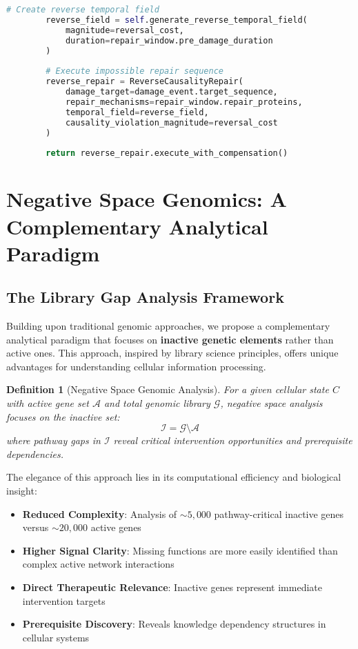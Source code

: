 \documentclass[12pt,a4paper]{article}
\newtheorem{definition}[theorem]{Definition}
\begin{document}
\begin{lstlisting}[language=Python, caption=Practical Miraculous Genomic Implementation, basicstyle=\footnotesize]
        # Create reverse temporal field
        reverse_field = self.generate_reverse_temporal_field(
            magnitude=reversal_cost,
            duration=repair_window.pre_damage_duration
        )
        
        # Execute impossible repair sequence
        reverse_repair = ReverseCausalityRepair(
            damage_target=damage_event.target_sequence,
            repair_mechanisms=repair_window.repair_proteins,
            temporal_field=reverse_field,
            causality_violation_magnitude=reversal_cost
        )
        
        return reverse_repair.execute_with_compensation()
\end{lstlisting}

\section{Negative Space Genomics: A Complementary Analytical Paradigm}

\subsection{The Library Gap Analysis Framework}

Building upon traditional genomic approaches, we propose a complementary analytical paradigm that focuses on \textbf{inactive genetic elements} rather than active ones. This approach, inspired by library science principles, offers unique advantages for understanding cellular information processing.

\begin{definition}[Negative Space Genomic Analysis]
For a given cellular state $C$ with active gene set $\mathcal{A}$ and total genomic library $\mathcal{G}$, negative space analysis focuses on the inactive set:
$$\mathcal{I} = \mathcal{G} \setminus \mathcal{A}$$
where pathway gaps in $\mathcal{I}$ reveal critical intervention opportunities and prerequisite dependencies.
\end{definition}

The elegance of this approach lies in its computational efficiency and biological insight:

\begin{itemize}
\item \textbf{Reduced Complexity}: Analysis of $\sim 5,000$ pathway-critical inactive genes versus $\sim 20,000$ active genes
\item \textbf{Higher Signal Clarity}: Missing functions are more easily identified than complex active network interactions  
\item \textbf{Direct Therapeutic Relevance}: Inactive genes represent immediate intervention targets
\item \textbf{Prerequisite Discovery}: Reveals knowledge dependency structures in cellular systems
\end{itemize}
\end{document}
